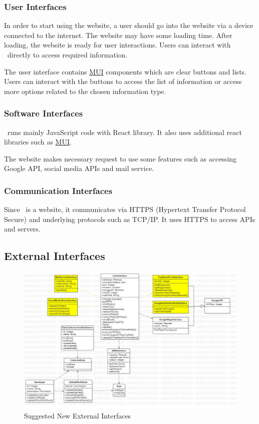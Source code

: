 \subsubsection{User Interfaces}

In order to start using the website, a user should go into the website via a device connected to the internet. The website may have some loading time. After loading, the website is ready for user interactions. Users can interact with \afetbilgi\ directly to access required information.

The user interface contains \href{https://mui.com/}{MUI} components which are clear buttons and lists. Users can interact with the buttons to access the list of information or access more options related to the chosen information type.

\subsubsection{Software Interfaces}

\afetbilgi\ runs mainly JavaScript code with React library. It also uses additional react libraries such as \href{https://mui.com/}{MUI}.

The website makes necessary request to use some features such as accessing Google API, social media APIs and mail service.

\subsubsection{Communication Interfaces}

Since \afetbilgi\ is a website, it communicates via HTTPS (Hypertext Transfer Protocol Secure) and underlying protocols such as TCP/IP. It uses HTTPS to access APIs and servers.

\subsection{External Interfaces}

\vfill
\begin{figure}[H]
  \centering
  \includegraphics[width=\linewidth]{img/external-interfaces-s4.jpg}
  \caption{Suggested New External Interfaces}
\end{figure}
\vfill
\newpage

